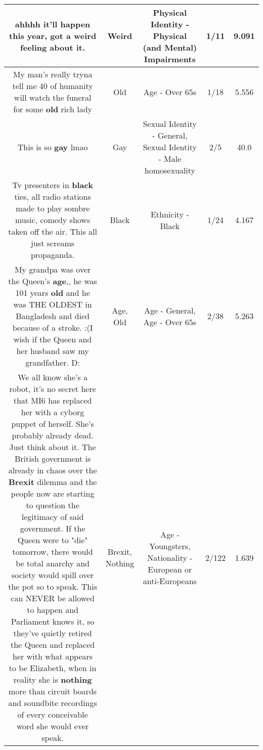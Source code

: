 \documentclass[11pt]{article}
\newlength\mylength
\begin{document}
\begin{center}
\begin{longtable}{|C{.65\mylength}|C{.30\mylength}|C{.12\mylength}|C{.12\mylength}|C{.12\mylength}|}
  \small ahhhh it'll happen this year, got a \textbf{weird} feeling about it.\normalsize   & Weird & Physical Identity - Physical (and Mental) Impairments & 1/11 & 9.091 \\  \hline
  \small My man's really tryna tell me 40 of humanity will watch the funeral for some \textbf{old} rich lady\normalsize   & Old & Age - Over 65s & 1/18 & 5.556 \\  \hline
  \small This is so \textbf{g\textbf{ay}} lmao\normalsize   & Gay & Sexual Identity - General, Sexual Identity - Male homosexuality & 2/5 & 40.0 \\  \hline
  \small Tv presenters in \textbf{black} ties, all radio stations made to play sombre music, comedy shows taken off the air. This all just screams propaganda.\normalsize   & Black & Ethnicity - Black & 1/24 & 4.167 \\  \hline
  \small My grandpa was over the Queen's \textbf{age},, he was 101 years \textbf{old} and he was THE OLDEST in Bangladesh and died because of a stroke. :(I wish if the Queen and her husband saw my grandfather. D:\normalsize   & Age, Old & Age - General, Age - Over 65s & 2/38 & 5.263 \\  \hline
  \small We all know she's a robot, it's no secret here that MI6 has replaced her with a cyborg puppet of herself. She's probably already dead. Just think about it. The British government is already in chaos over the \textbf{Brexit} dilemma and the people now are starting to question the legitimacy of said government. If the Queen were to "die" tomorrow, there would be total anarchy and society would spill over the pot so to speak. This can NEVER be allowed to happen and Parliament knows it, so they've quietly retired the Queen and replaced her with what appears to be Elizabeth, when in reality she is \textbf{nothing} more than circuit boards and soundbite recordings of every conceivable word she would ever speak.\normalsize   & Brexit, Nothing & Age - Youngsters, Nationality - European or anti-Europeans & 2/122 & 1.639 \\  \hline

\end{longtable}
\end{center}
\end{document}
